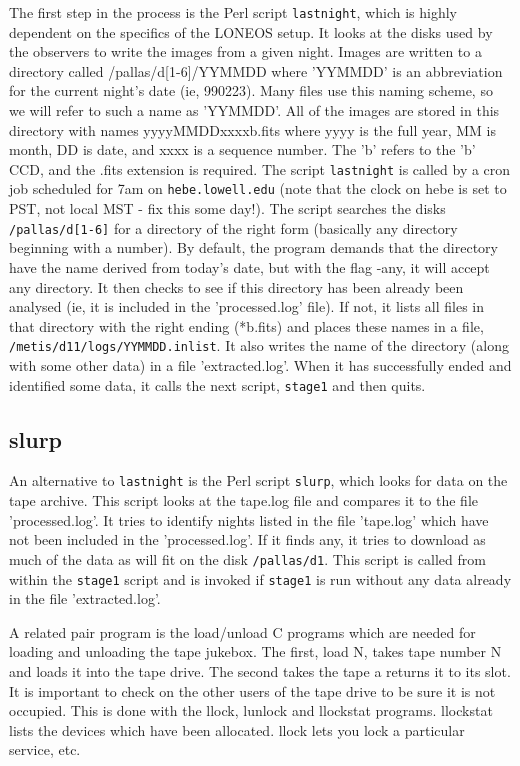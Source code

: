 \documentclass{article}
\begin{document}
The first step in the process is the Perl script {\tt lastnight},
which is highly dependent on the specifics of the LONEOS setup.  It
looks at the disks used by the observers to write the images from a
given night.  Images are written to a directory called
/pallas/d[1-6]/YYMMDD where 'YYMMDD' is an abbreviation for the current
night's date (ie, 990223).  Many files use this naming scheme, so we
will refer to such a name as 'YYMMDD'.  All of the images are stored
in this directory with names yyyyMMDDxxxxb.fits where yyyy is the full
year, MM is month, DD is date, and xxxx is a sequence number.  The 'b'
refers to the 'b' CCD, and the .fits extension is required.  The
script {\tt lastnight} is called by a cron job scheduled for 7am on
{\tt hebe.lowell.edu} (note that the clock on hebe is set to PST, not
local MST - fix this some day!).  The script searches the disks
{\tt /pallas/d[1-6]} for a directory of the right form (basically any
directory beginning with a number).  By default, the program demands
that the directory have the name derived from today's date, but with
the flag -any, it will accept any directory.  It then checks to see if
this directory has been already been analysed (ie, it is included in
the 'processed.log' file).  If not, it lists all files in that
directory with the right ending (*b.fits) and places these names in a
file, {\tt /metis/d11/logs/YYMMDD.inlist}.  It also writes the name of the
directory (along with some other data) in a file 'extracted.log'.
When it has successfully ended and identified some data, it calls the
next script, {\tt stage1} and then quits.

\subsection{slurp}

An alternative to {\tt lastnight} is the Perl script {\tt slurp},
which looks for data on the tape archive.  This script looks at the
tape.log file and compares it to the file 'processed.log'.  It tries
to identify nights listed in the file 'tape.log' which have not been
included in the 'processed.log'.  If it finds any, it tries to
download as much of the data as will fit on the disk {\tt /pallas/d1}.
This script is called from within the {\tt stage1} script and is
invoked if {\tt stage1} is run without any data already in
the file 'extracted.log'.

A related pair program is the load/unload C programs which are needed
for loading and unloading the tape jukebox.  The first, load N, takes
tape number N and loads it into the tape drive.  The second takes the
tape a returns it to its slot.  It is important to check on the other
users of the tape drive to be sure it is not occupied.  This is done
with the llock, lunlock and llockstat programs.  llockstat lists the
devices which have been allocated.  llock lets you lock a particular
service, etc.
\end{document}
